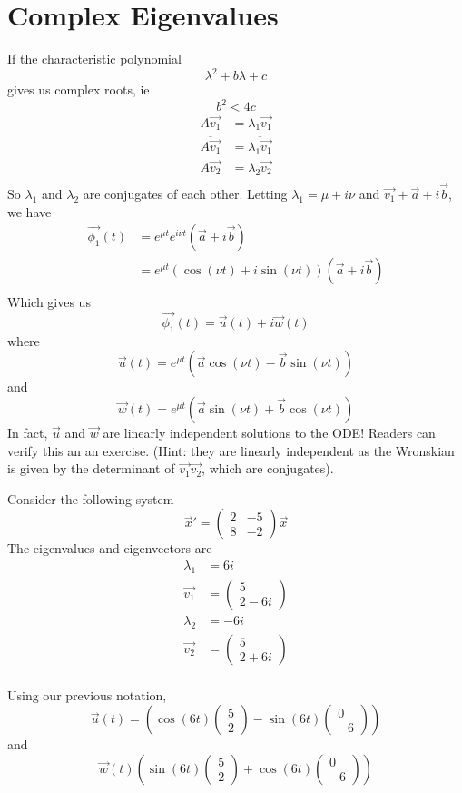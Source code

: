 \documentclass[12pt]{article}
\begin{document}
\section{Complex Eigenvalues}

If the characteristic polynomial
$$\lambda^2 + b\lambda + c$$
gives us complex roots, ie
$$b^2 < 4c$$
\begin{align*}
	A\vec{v_1} &= \lambda_1\vec{v_1} \\
	\overline{A\vec{v_1}} &= \overline{\lambda_1\vec{v_1}} \\
	A\vec{v_2} &= \lambda_2\vec{v_2} \\
\end{align*}
So $\lambda_1$ and $\lambda_2$ are conjugates of each other. Letting $\lambda_1 = \mu + i\nu$ and $\vec{v_1} + \vec{a} + i\vec{b}$, we have
\begin{align*}
	\vec{\phi_1}(t) &= e^{\mu t}e^{i\nu t}(\vec{a} + i\vec{b}) \\
			&= e^{\mu t}(\cos(\nu t) + i\sin(\nu t))(\vec{a} + i\vec{b}) \\
\end{align*}
Which gives us
$$\vec{\phi_1}(t) = \vec{u}(t) + i\vec{w}(t)$$
where
$$\vec{u}(t) = e^{\mu t}(\vec{a}\cos(\nu t) - \vec{b}\sin(\nu t))$$
and
$$\vec{w}(t) = e^{\mu t}(\vec{a}\sin(\nu t) + \vec{b}\cos(\nu t))$$
In fact, $\vec{u}$ and $\vec{w}$ are linearly independent solutions to the ODE! Readers can verify this an an exercise. (Hint: they are linearly independent as the Wronskian is given by the determinant of $\vec{v_1} \vec{v_2}$, which are conjugates).

Consider the following system
$$\vec{x}' = \begin{pmatrix} 2 & -5 \\ 8 & -2 \end{pmatrix} \vec{x}$$
The eigenvalues and eigenvectors are
\begin{align*}
	\lambda_1 &= 6i \\
	\vec{v_1} &= \begin{pmatrix} 5 \\ 2-6i \end{pmatrix} \\
	\lambda_2 &= -6i \\
	\vec{v_2} &= \begin{pmatrix} 5 \\ 2+6i \end{pmatrix} \\
\end{align*}

Using our previous notation,
$$\vec{u}(t) = \left(\cos(6t) \begin{pmatrix} 5 \\ 2 \end{pmatrix} - \sin(6t) \begin{pmatrix} 0 \\ -6 \end{pmatrix}\right)$$
and
$$\vec{w}(t) \left(\sin(6t) \begin{pmatrix} 5 \\ 2 \end{pmatrix} + \cos(6t) \begin{pmatrix} 0 \\ -6 \end{pmatrix}\right)$$
\end{document}
